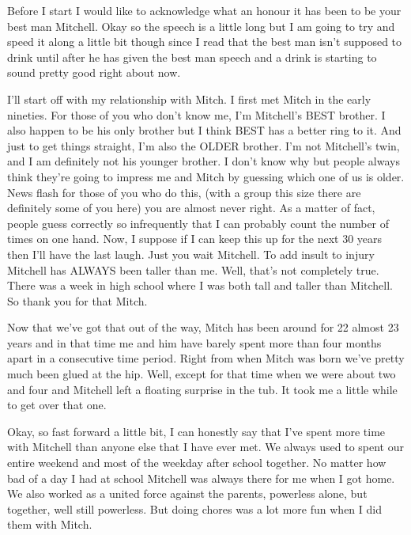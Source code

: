 Before I start I would like to acknowledge what an honour it has been to be your best man Mitchell. Okay so the speech is a little long but I am going to try and speed it along a little bit though since I read that the best man isn't supposed to drink until after he has given the best man speech and a drink is starting to sound pretty good right about now.

I'll start off with my relationship with Mitch. I first met Mitch in the early nineties. For those of you who don't know me, I’m Mitchell’s BEST brother. I also happen to be his only brother but I think BEST has a better ring to it. And just to get things straight, I'm also the OLDER brother. I’m not Mitchell’s twin, and I am definitely not his younger brother. I don't know why but people always think they're going to impress me and Mitch by guessing which one of us is older. News flash for those of you who do this, (with a group this size there are definitely some of you here) you are almost never right. As a matter of fact, people guess correctly so infrequently that I can probably count the number of times on one hand. Now, I suppose if I can keep this up for the next 30 years then I'll have the last laugh. Just you wait Mitchell. To add insult to injury Mitchell has ALWAYS been taller than me. Well, that's not completely true. There was a week in high school where I was both tall and taller than Mitchell. So thank you for that Mitch.

Now that we've got that out of the way, Mitch has been around for 22 almost 23 years and in that time me and him have barely spent more than four months apart in a consecutive time period. Right from when Mitch was born we've pretty much been glued at the hip. Well, except for that time when we were about two and four and Mitchell left a floating surprise in the tub. It took me a little while to get over that one.

Okay, so fast forward a little bit, I can honestly say that I've spent more time with Mitchell than anyone else that I have ever met. We always used to spent our entire weekend and most of the weekday after school together. No matter how bad of a day I had at school Mitchell was always there for me when I got home. We also worked as a united force against the parents, powerless alone, but together, well still powerless. But doing chores was a lot more fun when I did them with Mitch.

